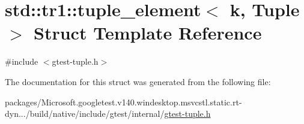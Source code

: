 \hypertarget{structstd_1_1tr1_1_1tuple__element}{}\section{std\+::tr1\+::tuple\+\_\+element$<$ k, Tuple $>$ Struct Template Reference}
\label{structstd_1_1tr1_1_1tuple__element}


{\ttfamily \#include $<$gtest-\/tuple.\+h$>$}



The documentation for this struct was generated from the following file\+:\begin{DoxyCompactItemize}
\item 
packages/\+Microsoft.\+googletest.\+v140.\+windesktop.\+msvcstl.\+static.\+rt-\/dyn.../build/native/include/gtest/internal/\mbox{\hyperlink{gtest-tuple_8h}{gtest-\/tuple.\+h}}\end{DoxyCompactItemize}
